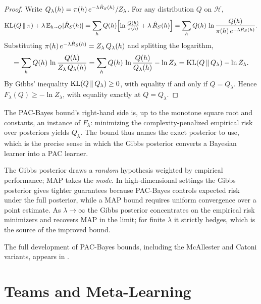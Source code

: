 \begin{proof}
Write $Q_\lambda(h) = \pi(h)\,e^{-\lambda \hat{R}_S(h)} / Z_\lambda$. For any distribution $Q$ on $\mathcal{H}$,
\[
\mathrm{KL}(Q \,\|\, \pi) + \lambda\,\mathbb{E}_{h\sim Q}[\hat{R}_S(h)]
= \sum_h Q(h)\Bigl[\ln \tfrac{Q(h)}{\pi(h)} + \lambda\,\hat{R}_S(h)\Bigr]
= \sum_h Q(h)\,\ln \frac{Q(h)}{\pi(h)\,e^{-\lambda \hat{R}_S(h)}}.
\]
Substituting $\pi(h)\,e^{-\lambda \hat{R}_S(h)} = Z_\lambda\,Q_\lambda(h)$ and splitting the logarithm,
\[
= \sum_h Q(h)\,\ln \frac{Q(h)}{Z_\lambda\,Q_\lambda(h)}
= \sum_h Q(h)\,\ln \frac{Q(h)}{Q_\lambda(h)} - \ln Z_\lambda
= \mathrm{KL}(Q \,\|\, Q_\lambda) - \ln Z_\lambda .
\]
By Gibbs' inequality $\mathrm{KL}(Q \,\|\, Q_\lambda) \geq 0$, with equality if and only if $Q = Q_\lambda$. Hence $F_\lambda(Q) \geq -\ln Z_\lambda$, with equality exactly at $Q = Q_\lambda$.
\end{proof}

The PAC-Bayes bound's right-hand side is, up to the monotone square root and constants, an instance of $F_\lambda$: minimizing the complexity-penalized empirical risk over posteriors yields $Q_\lambda$. The bound thus names the exact posterior to use, which is the precise sense in which the Gibbs posterior converts a Bayesian learner into a PAC learner.

\begin{remark}
\label{rmk:gibbs-vs-map}
The Gibbs posterior draws a \emph{random} hypothesis weighted by empirical performance; MAP takes the \emph{mode}. In high-dimensional settings the Gibbs posterior gives tighter guarantees because PAC-Bayes controls expected risk under the full posterior, while a MAP bound requires uniform convergence over a point estimate. As $\lambda \to \infty$ the Gibbs posterior concentrates on the empirical risk minimizers and recovers MAP in the limit; for finite $\lambda$ it strictly hedges, which is the source of the improved bound.
\end{remark}

The full development of PAC-Bayes bounds, including the McAllester and Catoni variants, appears in .


\section{Teams and Meta-Learning}
\label{sec:teams-meta}

